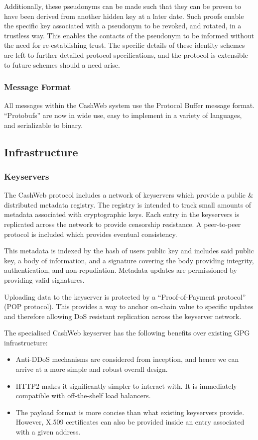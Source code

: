 \documentclass{article}
\begin{document}
Additionally, these pseudonyms can be made such that they can be proven to have been derived from another hidden key at a later date. Such proofs enable the specific key associated with a pseudonym to be revoked, and rotated, in a trustless way. This enables the contacts of the pseudonym to be informed without the need for re-establishing trust. The specific details of these identity schemes are left to further detailed protocol specifications, and the protocol is extensible to future schemes should a need arise.

\subsubsection{Message Format}

All messages within the CashWeb system use the Protocol Buffer\supercite{protobufs} message format. ``Protobufs'' are now in wide use, easy to implement in a variety of languages, and serializable to binary.

\subsection{Infrastructure}

\subsubsection{Keyservers}

The CashWeb protocol includes a network of keyservers which provide a public \& distributed metadata registry. The registry is intended to track small amounts of metadata associated with cryptographic keys. Each entry in the keyservers is replicated across the network to provide censorship resistance. A peer-to-peer protocol is included which provides eventual consistency.

This metadata is indexed by the hash of users public key and includes said public key, a body of information, and a signature covering the body providing integrity, authentication, and non-repudiation. Metadata updates are permissioned by providing valid signatures.

Uploading data to the keyserver is protected by a ``Proof-of-Payment protocol'' (POP protocol). This provides a way to anchor on-chain value to specific updates and therefore allowing DoS resistant replication across the keyserver network.

The specialised CashWeb keyserver has the following benefits over existing GPG infrastructure:
\begin{itemize}
  \item Anti-DDoS mechanisms are considered from inception, and hence we can arrive at a more simple and robust overall design.
  \item HTTP2 makes it significantly simpler to interact with. It is immediately compatible with off-the-shelf load balancers.
  \item The payload format is more concise than what existing keyservers provide. However, X.509 certificates can also be provided inside an entry associated with a given address.
\end{itemize}
\end{document}
